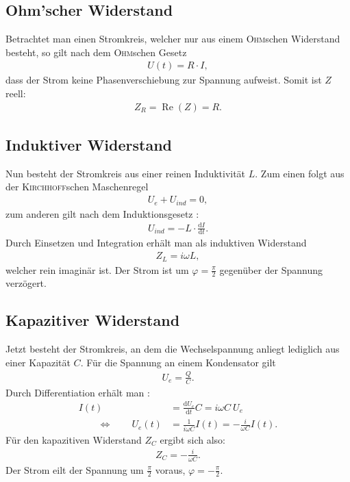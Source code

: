 \documentclass[12pt,a4paper,titlepage,headinclude]{scrartcl}
\numberwithin{equation}{subsection}
\renewcommand{\d}{\ensuremath{\mathrm{d}}} %
\newcommand{\aeqiv}{\ensuremath{\qquad \Longleftrightarrow \qquad}} %
\newcommand{\person}[1]{\textsc{#1}}
\begin{document}
\subsection{Ohm'scher Widerstand}
Betrachtet man einen Stromkreis, welcher nur aus einem \person{Ohm}schen Widerstand besteht, so gilt nach dem \person{Ohm}schen Gesetz
\begin{align}
	U(t)=R\cdot I,
	\label{eq:ohm}
\end{align}
dass der Strom keine Phasenverschiebung zur Spannung aufweist. Somit ist $Z$ reell:
\begin{align}
	Z_{R}=\operatorname{Re}(Z)=R.
	\label{eq:zR}
\end{align}
\subsection{Induktiver Widerstand}
Nun besteht der Stromkreis aus einer reinen Induktivität $L$. Zum einen folgt aus der \person{Kirchhoff}schen Maschenregel \cite[55]{demtroeder2}
\begin{align}
	U_e+U_{ind}=0,
	\label{eq:indmasche}
\end{align}
zum anderen gilt nach dem Induktionsgesetz \cite[131]{demtroeder2}:
\begin{align}
	U_{ind}=-L\cdot\frac{\d I}{\d t}.
	\label{eq:uind}
\end{align}
Durch Einsetzen und Integration erhält man als induktiven Widerstand \cite[256]{nol3}
\begin{align}
	Z_{L}=i\omega L,
	\label{eq:zL}
\end{align}
welcher rein imaginär ist. Der Strom ist um $\varphi=\frac{\pi}{2}$ gegenüber der Spannung verzögert.
\subsection{Kapazitiver Widerstand}
Jetzt besteht der Stromkreis, an dem die Wechselspannung anliegt lediglich aus einer Kapazität $C$. Für die Spannung an einem Kondensator gilt \cite[152]{demtroeder2}
\begin{align}
	U_e=\frac{Q}{C}.
	\label{eq:kond}
\end{align}
Durch Differentiation erhält man \cite[257]{nol3}:
\begin{align}
	I(t)&=\frac{\d U_e}{\d t}C=i\omega C~ U_e\\
	\aeqiv U_e(t)&=\frac{1}{i\omega C}I(t)=-\frac{i}{\omega C}I(t).
	\label{eq:herleitungzC}
\end{align}
Für den kapazitiven Widerstand $Z_C$ ergibt sich also:
\begin{align}
	Z_C=-\frac{i}{\omega C}.
	\label{eq:zC}
\end{align}
Der Strom eilt der Spannung um $\frac{\pi}{2}$ voraus, $\varphi=-\frac{\pi}{2}$.
\end{document}
